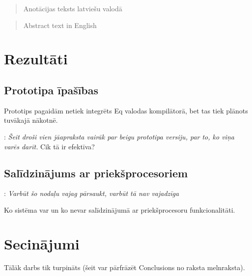 \documentclass[12pt, a4paper]{report}
\newcommand{\fixme}[1]{\vskip 5mm\noindent{\bf FIXME}: {\it #1}}
\begin{document}
\titullapa

\begin{abstract}
Anotācijas teksts latviešu valodā
\end{abstract}

\begin{otherlanguage}{english}
\begin{abstract}
Abstract text in English
\end{abstract}
\end{otherlanguage}

\setcounter{tocdepth}{4}
\tableofcontents













\section{Rezultāti}
\subsection{Prototipa īpašības}
 Prototips pagaidām netiek integrēts Eq valodas kompilātorā, bet tas tiek plānots tuvākajā nākotnē.


\fixme{Šeit droši vien jāapraksta vairāk par beigu prototipa versiju, par to, ko viņa varēs darīt.} Cik tā ir efektīva?



\subsection{Salīdzinājums ar priekšprocesoriem}
\fixme{Varbūt šo nodaļu vajag pārsaukt, varbūt tā nav vajadzīga}

Ko sistēma var un ko nevar salīdzinājumā ar priekšprocesoru funkcionalitāti.

\section{Secinājumi}
Tālāk darbs tik turpināts (šeit var pārfrāzēt Conclusions no raksta melnraksta).



{}

\end{document}
